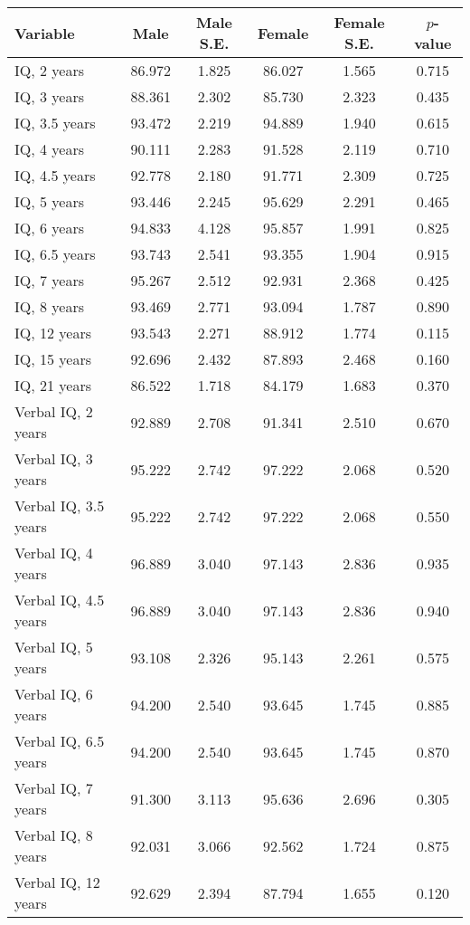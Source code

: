 \begin{tabular}{l c c c c c}
\toprule
\textbf{Variable} & \textbf{Male} & \textbf{Male S.E.}  & \textbf{Female} & \textbf{Female S.E.} & \textbf{$ p $-value} \\
\midrule
IQ, 2 years & 86.972 & 1.825 &  86.027 & 1.565 & 0.715 \\
IQ, 3 years & 88.361 & 2.302 &  85.730 & 2.323 & 0.435 \\
IQ, 3.5 years & 93.472 & 2.219 &  94.889 & 1.940 & 0.615 \\
IQ, 4 years & 90.111 & 2.283 &  91.528 & 2.119 & 0.710 \\
IQ, 4.5 years & 92.778 & 2.180 &  91.771 & 2.309 & 0.725 \\
IQ, 5 years & 93.446 & 2.245 &  95.629 & 2.291 & 0.465 \\
IQ, 6 years & 94.833 & 4.128 &  95.857 & 1.991 & 0.825 \\
IQ, 6.5 years & 93.743 & 2.541 &  93.355 & 1.904 & 0.915 \\
IQ, 7 years & 95.267 & 2.512 &  92.931 & 2.368 & 0.425 \\
IQ, 8 years & 93.469 & 2.771 &  93.094 & 1.787 & 0.890 \\
IQ, 12 years & 93.543 & 2.271 &  88.912 & 1.774 & 0.115 \\
IQ, 15 years & 92.696 & 2.432 &  87.893 & 2.468 & 0.160 \\
IQ, 21 years & 86.522 & 1.718 &  84.179 & 1.683 & 0.370 \\
Verbal IQ, 2 years & 92.889 & 2.708 &  91.341 & 2.510 & 0.670 \\
Verbal IQ, 3 years & 95.222 & 2.742 &  97.222 & 2.068 & 0.520 \\
Verbal IQ, 3.5 years & 95.222 & 2.742 &  97.222 & 2.068 & 0.550 \\
Verbal IQ, 4 years & 96.889 & 3.040 &  97.143 & 2.836 & 0.935 \\
Verbal IQ, 4.5 years & 96.889 & 3.040 &  97.143 & 2.836 & 0.940 \\
Verbal IQ, 5 years & 93.108 & 2.326 &  95.143 & 2.261 & 0.575 \\
Verbal IQ, 6 years & 94.200 & 2.540 &  93.645 & 1.745 & 0.885 \\
Verbal IQ, 6.5 years & 94.200 & 2.540 &  93.645 & 1.745 & 0.870 \\
Verbal IQ, 7 years & 91.300 & 3.113 &  95.636 & 2.696 & 0.305 \\
Verbal IQ, 8 years & 92.031 & 3.066 &  92.562 & 1.724 & 0.875 \\
Verbal IQ, 12 years & 92.629 & 2.394 &  87.794 & 1.655 & 0.120 \\

\end{tabular}
